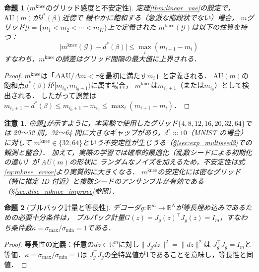 \documentclass[11pt,a4paper]{jsarticle}
\newtheorem{proposition}{命題}
\newtheorem{remark}{注意}
\newcommand{\Jg}{J_g}
\newcommand{\R}{\mathbb{R}}
\newcommand{\kap}{\kappa}
\newcommand{\mknee}{m^{\mathrm{knee}}}
\begin{document}
\begin{proposition}[$\mknee$のグリッド感度と不安定性]\label{thm:mknee_instab}
定理\ref{thm:linear_vae}の設定で，$\mathrm{AU}(m)$が$d^*(\beta)$近傍で
緩やかに飽和する（急激な階段状でない）場合，
$m$グリッド$\mathcal{G} = \{m_1 < m_2 < \cdots < m_K\}$上で定義された
$\mknee(\mathcal{G})$は以下の性質を持つ：
\begin{equation}
  \bigl|\mknee(\mathcal{G}) - d^*(\beta)\bigr|
  \leq \max_{i} (m_{i+1} - m_i)
  \label{eq:mknee_error}
\end{equation}
すなわち，$\mknee$の誤差はグリッド間隔の最大値に上界される．
\end{proposition}

\begin{proof}
$\mknee$は「$\Delta\mathrm{AU}/\Delta m < \tau$を最初に満たす$m_i$」と定義される．
AU$(m)$の飽和点$d^*(\beta)$が$[m_{i_0}, m_{i_0+1})$に属す場合，
$\mknee$は$m_{i_0+1}$（または$m_{i_0}$）として検出される．
したがって誤差は$m_{i_0+1} - d^*(\beta) \leq m_{i_0+1} - m_{i_0} \leq \max_i(m_{i+1}-m_i)$．
\end{proof}

\begin{remark}
命題\ref{thm:mknee_instab}が示すように，本実験で使用したグリッド$\{4,8,12,16,20,32,64\}$では
20〜32 間，32〜64 間に大きなギャップがあり，$d^* \approx 10$（MNIST の場合）に対して
$\mknee \in \{32, 64\}$という不安定性が生じうる（§\ref{sec:exp_multiseed2}での観測と整合）．
加えて，実際の学習では確率的最適化（乱数シードによる初期化の違い）が AU$(m)$の形状に
ランダムなノイズを加えるため，不安定性は式\eqref{eq:mknee_error}より実質的に大きくなる．
$\mknee$の安定化には密なグリッド（特に推定 ID 付近）と複数シードのアンサンブルが有効である
（§\ref{sec:disc_mknee_improve}参照）．
\end{remark}

\begin{proposition}[プルバック計量と等長性]\label{thm:pullback}
デコーダ$g: \R^m \to \R^N$が等長埋め込みであるための必要十分条件は，
プルバック計量$G(z) = \Jg(z)^\top \Jg(z) = I_m$，すなわち条件数$\kap = \sigma_{\max}/\sigma_{\min} = 1$である．
\end{proposition}

\begin{proof}
等長性の定義：任意の$dz \in \R^m$に対し$\|J_g dz\|^2 = \|dz\|^2$は
$J_g^\top J_g = I_m$と等価．$\kap = \sigma_{\max}/\sigma_{\min} = 1$は
$J_g^\top J_g$の全特異値が1であることを意味し，等長性と同値．
\end{proof}
\end{document}
